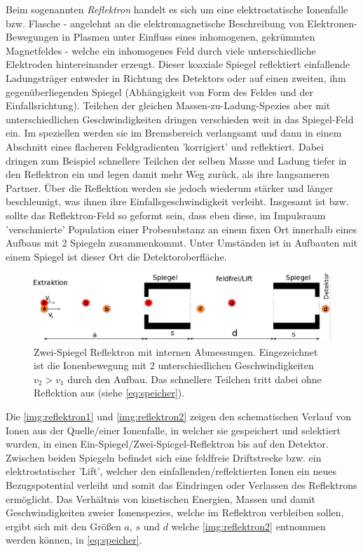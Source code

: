 \documentclass[numbers=noenddot,a4paper,notitlepage,twoside,BCOR15mm]{scrartcl}
\newcommand{\ix}[1]{_\text{#1}}
\newcommand{\tilt}[1]{\textit{#1}}
\begin{document}
		Beim sogenannten \tilt{Reflektron} handelt es sich um eine elektrostatische Ionenfalle bzw. Flasche - angelehnt an die elektromagnetische Beschreibung von Elektronen-Bewegungen in Plasmen unter Einfluss eines inhomogenen, gekrümmten Magnetfeldes - welche ein inhomogenes Feld durch viele unterschiedliche Elektroden hintereinander erzeugt. Dieser koaxiale Spiegel reflektiert einfallende Ladungsträger entweder in Richtung des Detektors oder auf einen zweiten, ihm gegenüberliegenden Spiegel (Abhängigkeit von Form des Feldes und der Einfallsrichtung). Teilchen der gleichen Massen-zu-Ladung-Spezies aber mit unterschiedlichen Geschwindigkeiten dringen verschieden weit in das Spiegel-Feld ein. Im speziellen werden sie im Bremsbereich verlangsamt und dann in einem Abschnitt eines flacheren Feldgradienten 'korrigiert' und reflektiert. Dabei dringen zum Beispiel schnellere Teilchen der selben Masse und Ladung tiefer in den Reflektron ein und legen damit mehr Weg zurück, als ihre langsameren Partner. Über die Reflektion werden sie jedoch wiederum stärker und länger beschleunigt, was ihnen ihre Einfallsgeschwindigkeit verleiht. Insgesamt ist bzw. sollte das Reflektron-Feld so geformt sein, dass eben diese, im Impulsraum 'verschmierte' Population einer Probesubstanz an einem fixen Ort innerhalb eines Aufbaus mit 2 Spiegeln zusammenkommt. Unter Umständen ist in Aufbauten mit einem Spiegel ist dieser Ort die Detektoroberfläche.

			\begin{figure}[b]
				\centering
				\includegraphics[width=\textwidth]{zweispiegel.png}
				\caption{Zwei-Spiegel Reflektron mit internen Abmessungen. Eingezeichnet ist die Ionenbewegung mit 2 unterschiedlichen Geschwindigkeiten $v\ix{2}>v\ix{1}$ durch den Aufbau. Das schnellere Teilchen tritt dabei ohne Reflektion aus (siehe \autoref{eq:speicher}). \cite{EMAUGreifswaldReflektron}}
				\label{img:reflektron2}
			\end{figure}

		Die \autoref{img:reflektron1} und \autoref{img:reflektron2} zeigen den schematischen Verlauf von Ionen aus der Quelle/einer Ionenfalle, in welcher sie gespeichert und selektiert wurden, in einen Ein-Spiegel/Zwei-Spiegel-Reflektron bis auf den Detektor. Zwischen beiden Spiegeln befindet sich eine feldfreie Driftstrecke bzw. ein elektrostatischer 'Lift', welcher den einfallenden/reflektierten Ionen ein neues Bezugspotential verleiht und somit das Eindringen oder Verlassen des Reflektrons ermöglicht. Das Verhältnis von kinetischen Energien, Massen und damit Geschwindigkeiten zweier Ionenspezies, welche im Reflektron verbleiben sollen, ergibt sich mit den Größen $a$, $s$ und $d$ welche \autoref{img:reflektron2} entnommen werden können, in \autoref{eq:speicher}.
\end{document}

